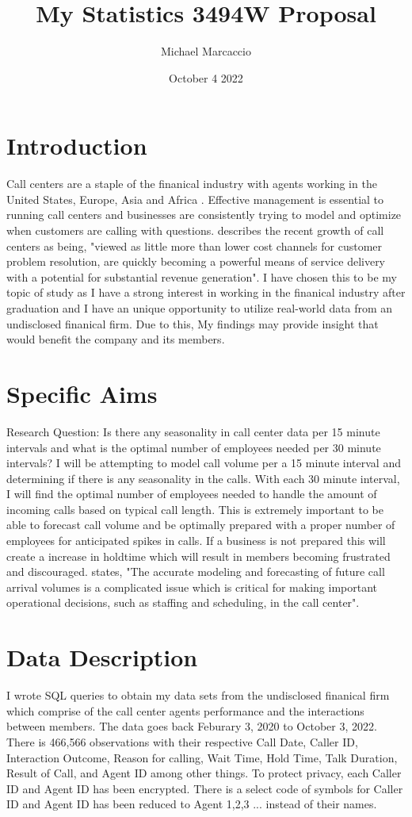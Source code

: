 \documentclass[12pt]{article}
\title{My Statistics 3494W Proposal}
\author{Michael  Marcaccio}
\date{October 4 2022}
\begin{document}
\maketitle

\section*{Introduction}
Call centers are a staple of the finanical industry with agents working in the United States, Europe, Asia and Africa \citep{ibrahim2016modeling}. 
Effective management is essential to running call centers and businesses are consistently trying to model and optimize when customers are calling with questions. 
\citet*{evensen1999effective} describes the recent growth of call centers as being, "viewed as little more than lower cost channels for customer
problem resolution, are quickly becoming a powerful means of service delivery with a potential for substantial revenue generation".
I have chosen this to be my topic of study as I have a strong interest in working in the finanical industry after graduation and I have an unique opportunity to utilize real-world data from an undisclosed
finanical firm. Due to this, My findings may provide insight that would benefit the company and its members.

\section*{Specific Aims}
Research Question: Is there any seasonality in call center data per 15 minute intervals and what is the optimal number of employees needed per 30 minute intervals?
I will be attempting to model call volume per a 15 minute interval and determining if there is any seasonality in the calls. With each 30 minute interval,
I will find the optimal number of employees needed to handle the amount of incoming calls based on typical call length. This is extremely important
to be able to forecast call volume and be optimally prepared with a proper number of employees for anticipated spikes in calls. If a business is not prepared
this will create a increase in holdtime which will result in members becoming frustrated and discouraged. \citet*{ibrahim2016modeling} states, "The accurate modeling and forecasting of future call arrival volumes is a 
complicated issue which is critical for making important operational decisions, such as staffing and scheduling, in the call center".
    
\section*{Data Description}
I wrote SQL queries to obtain my data sets from the undisclosed finanical firm which comprise of the call center agents performance and the interactions between members. 
The data goes back Feburary 3, 2020 to October 3, 2022. There is 466,566 observations with their respective Call Date, Caller ID, Interaction Outcome,
Reason for calling, Wait Time, Hold Time, Talk Duration, Result of Call, and Agent ID among other things. To protect privacy, each Caller ID
and Agent ID has been encrypted. There is a select code of symbols for Caller ID and Agent ID has been reduced to Agent 1,2,3 ... instead of 
their names.
\end{document}
